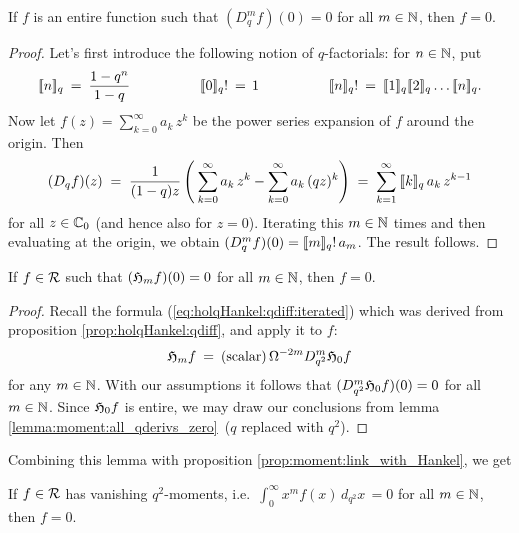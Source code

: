 \begin{lemma} \label{lemma:moment:all_qderivs_zero}
If $f$ is an entire function such that $(D_q^m f)(0) = 0$ for all $m\in \mathbb{N}$,
then $f=0$.
\end{lemma}
\begin{proof}
Let's first introduce the following notion of $q$-factorials: for $n\in \mathbb{N}$, put
$$ \varqfac{n}  \:=\: \frac{1-q^n}{1-q}
         \hspace{5em}
   \varqfac{0}! \:=\, 1 \hspace{5em}
   \varqfac{n}! \:=\: \varqfac{1} \varqfac{2} \ldots \varqfac{n}.  $$
Now let $f(z) = \sum_{k=0}^\infty a_k\, z^k$ be the power series expansion of $f$
around the origin. Then
$$ (D_q f)(z)
       \;=\; \frac{1}{(1-q)z} \left(\:
             \sum_{k=0}^\infty a_k\, z^k  - \sum_{k=0}^\infty a_k\, (q z)^k  \right)
       \;=\; \sum_{k=1}^\infty \: [\![ k ]\!]_q \, a_k \, z^{k-1} $$
for all $z\in \mathbb{C}_0$ (and hence also for $z=0$).
Iterating this $m\in \mathbb{N}$ times and then evaluating at the origin, we obtain
$(D_q^m f)(0) = [\![ m ]\!]_q! \, a_m$. The result follows.
\end{proof}


\begin{lemma}
If $f\in\mathcal R$ such that $(\mathfrak{H}_{m}f)(0) = 0$ for all $m\in \mathbb{N}$,
then $f=0$.
\end{lemma}
\begin{proof}
Recall the formula (\ref{eq:holqHankel:qdiff:iterated}) which was
derived from proposition \ref{prop:holqHankel:qdiff}, and apply it to $f$:
$$  \mathfrak{H}_{m} f \:=\: ({\rm scalar})\, \Omega^{-2m} D_{q^2}^m \mathfrak{H}_{0} f $$
for any $m\in\mathbb{N}$. With our assumptions it follows that
$(D_{q^2}^m \mathfrak{H}_{0} f)(0) = 0$ for all $m\in \mathbb{N}$.
Since $\mathfrak{H}_{0} f$ is entire, we may draw our conclusions from lemma
\ref{lemma:moment:all_qderivs_zero}\ ($q$ replaced with $q^2$).
\end{proof}

\vspace{2ex}
Combining this lemma with proposition \ref{prop:moment:link_with_Hankel}, we get

\begin{thm} \label{thm:qmoment}
If $f\in\mathcal R$ has vanishing $q^2$-moments, i.e.\
$\int_0^\infty x^m f(x)\, d_{q^2}x \,= 0$ for all $m\in\mathbb{N}$, then $f=0$.
\end{thm}
